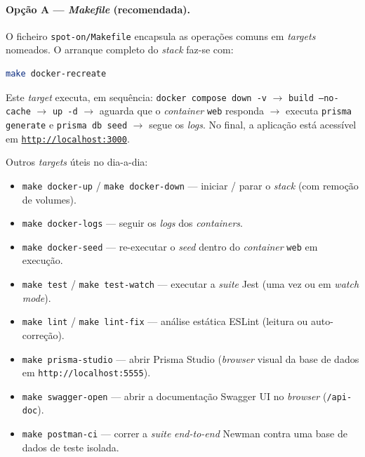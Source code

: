 \documentclass[11pt,a4paper]{article}
\begin{document}
\paragraph{Opção A --- \emph{Makefile} (recomendada).}
O ficheiro \texttt{spot-on/Makefile} encapsula as operações comuns em
\emph{targets} nomeados. O arranque completo do \emph{stack} faz-se com:

\begin{lstlisting}[language=bash]
make docker-recreate
\end{lstlisting}

Este \emph{target} executa, em sequência: \texttt{docker compose down -v}
$\to$ \texttt{build --no-cache} $\to$ \texttt{up -d} $\to$ aguarda que o
\emph{container} \texttt{web} responda $\to$ executa \texttt{prisma generate}
e \texttt{prisma db seed} $\to$ segue os \emph{logs}. No final, a aplicação
está acessível em \href{http://localhost:3000}{\texttt{http://localhost:3000}}.

\noindent Outros \emph{targets} úteis no dia-a-dia:

\begin{itemize}[leftmargin=*]
    \item \texttt{make docker-up} / \texttt{make docker-down} --- iniciar /
          parar o \emph{stack} (com remoção de volumes).
    \item \texttt{make docker-logs} --- seguir os \emph{logs} dos
          \emph{containers}.
    \item \texttt{make docker-seed} --- re-executar o \emph{seed} dentro do
          \emph{container} \texttt{web} em execução.
    \item \texttt{make test} / \texttt{make test-watch} --- executar a
          \emph{suite} Jest (uma vez ou em \emph{watch mode}).
    \item \texttt{make lint} / \texttt{make lint-fix} --- análise estática
          ESLint (leitura ou auto-correção).
    \item \texttt{make prisma-studio} --- abrir Prisma Studio (\emph{browser}
          visual da base de dados em \texttt{http://localhost:5555}).
    \item \texttt{make swagger-open} --- abrir a documentação Swagger UI no
          \emph{browser} (\texttt{/api-doc}).
    \item \texttt{make postman-ci} --- correr a \emph{suite}
          \emph{end-to-end} Newman contra uma base de dados de teste
          isolada.
\end{itemize}
\end{document}

